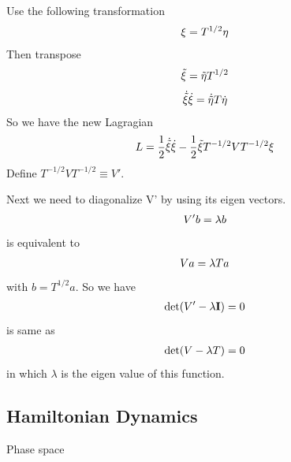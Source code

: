 \documentclass[letterpaper,10pt,english]{sphinxmanual}
\begin{document}
Use the following transformation
\begin{gather}
\begin{split}\xi = T^{1/2}\eta\end{split}\notag
\end{gather}
Then transpose
\begin{gather}
\begin{split}\tilde \xi = \tilde \eta T^{1/2}\end{split}\notag
\end{gather}\begin{gather}
\begin{split}\dot{\tilde \xi} \dot \xi = \dot {\tilde \eta} T \dot \eta\end{split}\notag
\end{gather}
So we have the new Lagragian
\begin{gather}
\begin{split}L = \frac{1}{2} \dot{\tilde \xi} \dot \xi - \frac{1}{2} \tilde \xi T^{-1/2} V T^{-1/2} \xi\end{split}\notag
\end{gather}
Define \(T^{-1/2} V T^{-1/2} \equiv V'\).

Next we need to diagonalize V' by using its eigen vectors.
\begin{gather}
\begin{split}V' b = \lambda b\end{split}\notag
\end{gather}
is equivalent to
\begin{gather}
\begin{split}V a = \lambda T a\end{split}\notag
\end{gather}
with \(b = T^{1/2} a\). So we have
\begin{gather}
\begin{split}\det(V' - \lambda \mathbf I) = 0\end{split}\notag
\end{gather}
is same as
\begin{gather}
\begin{split}\det(V - \lambda T) = 0\end{split}\notag
\end{gather}
in which \(\lambda\) is the eigen value of this function.


\subsection{Hamiltonian Dynamics}
\label{ClassicalMechanics:hamiltonian-dynamics}
Phase space
\end{document}
